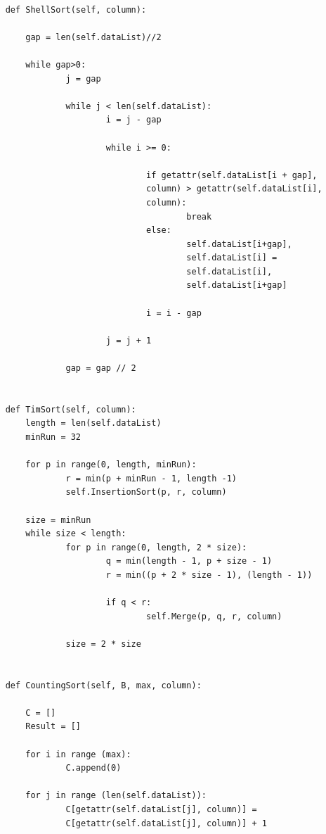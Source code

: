 \documentclass[12pt]{article}
\begin{document}
\begin{verbatim}
    
    def ShellSort(self, column):

        gap = len(self.dataList)//2
     
        while gap>0:
                j = gap
                
                while j < len(self.dataList):
                        i = j - gap 
                        
                        while i >= 0:
                                
                                if getattr(self.dataList[i + gap],
                                column) > getattr(self.dataList[i],
                                column):
                                        break
                                else:
                                        self.dataList[i+gap],
                                        self.dataList[i] =
                                        self.dataList[i],
                                        self.dataList[i+gap]
                
                                i = i - gap 

                        j = j + 1
                        
                gap = gap // 2


    def TimSort(self, column):
        length = len(self.dataList)
        minRun = 32

        for p in range(0, length, minRun):
                r = min(p + minRun - 1, length -1)
                self.InsertionSort(p, r, column)

        size = minRun
        while size < length:
                for p in range(0, length, 2 * size):
                        q = min(length - 1, p + size - 1)
                        r = min((p + 2 * size - 1), (length - 1))

                        if q < r:
                                self.Merge(p, q, r, column)        

                size = 2 * size

                
    def CountingSort(self, B, max, column):

        C = []
        Result = []

        for i in range (max):
                C.append(0)

        for j in range (len(self.dataList)):
                C[getattr(self.dataList[j], column)] =
                C[getattr(self.dataList[j], column)] + 1


\end{verbatim}
\end{document}

